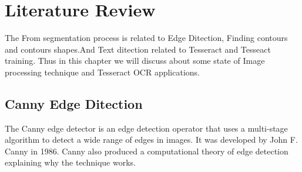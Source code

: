 \chapter {Literature Review}
\label{literature_review}
The From segmentation process is related to Edge Ditection, Finding contours and contours shapes.And Text ditection related to Tesseract and Tesseact training. Thus in this chapter we will discuss about some state of Image processing technique and Tesseract OCR applications.
\section{Canny Edge Ditection}
The Canny edge detector is an edge detection operator that uses a multi-stage algorithm to detect a wide range of edges in images. It was developed by John F. Canny in 1986. Canny also produced a computational theory of edge detection explaining why the technique works.
